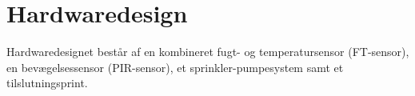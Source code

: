 \section{Hardwaredesign}

Hardwaredesignet består af en kombineret fugt- og temperatursensor (FT-sensor), en bevægelsessensor (PIR-sensor), et sprinkler-pumpesystem samt et tilslutningsprint. 











